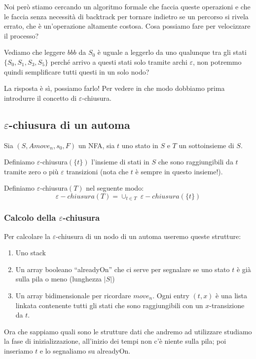 \documentclass[class=book, crop=false, oneside, 12pt]{standalone}
\begin{document}
Noi però stiamo cercando un algoritmo formale che faccia queste operazioni e che le faccia senza necessità di backtrack per tornare indietro se un percorso si rivela errato, che è un'operazione altamente costosa.
Cosa possiamo fare per velocizzare il processo?

Vediamo che leggere \(bbb\) da \(S_0\) è uguale a leggerlo da uno qualunque tra gli stati \(\{S_0, S_1, S_3, S_5\}\) perché arrivo a questi stati solo tramite archi \(\varepsilon\), non potremmo quindi semplificare tutti questi in un solo nodo?

La risposta è sì, possiamo farlo! Per vedere in che modo dobbiamo prima introdurre il concetto di \(\varepsilon\)-chiusura.


\subsection{\(\varepsilon\)-chiusura di un automa}
Sia \((S, A move_n, s_0, F)\) un NFA, sia \(t\) uno stato in \(S\) e \(T\) un sottoinsieme di \(S\).

Definiamo \(\varepsilon\)-chiusura\((\{t\})\) l’insieme di stati in \(S\) che sono raggiungibili da \(t\) tramite zero o più \(\varepsilon\) transizioni (nota che \(t\) è sempre in questo insieme!).

Definiamo \(\varepsilon\)-chiusura\((T)\) nel seguente modo:
\begin{equation}
    \varepsilon-chiusura(T) = \cup_{t \in T} \;\varepsilon-chiusura(\{t\})
\end{equation} 

\subsubsection{Calcolo della \(\varepsilon\)-chiusura}
Per calcolare la \(\varepsilon\)-chiusura di un nodo di un automa useremo queste strutture:
\begin{enumerate}
    \item Uno stack
    \item Un array booleano “alreadyOn” che ci serve per segnalare se uno stato \(t\) è già sulla pila o meno (lunghezza \(|S|\))
    \item Un array bidimensionale per ricordare \(move_n\). Ogni entry \((t,x)\) è una lista linkata contenente tutti gli stati che sono raggiungibili con un \(x\)-transizione da \(t\).
\end{enumerate}
Ora che sappiamo quali sono le strutture dati che andremo ad utilizzare studiamo la fase di inizializzazione, all’inizio dei tempi non c’è niente sulla pila; poi inseriamo \(t\) e lo segnaliamo su alreadyOn.
\end{document}
